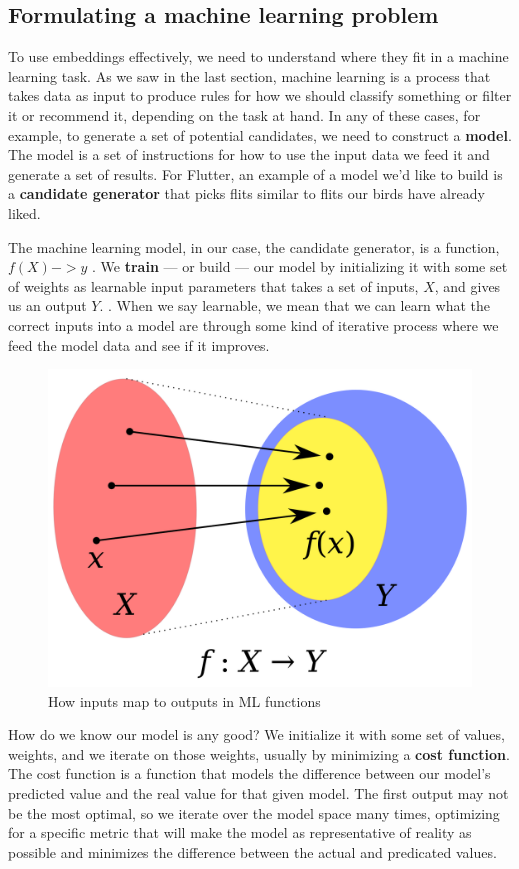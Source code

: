 \documentclass[11pt, table]{diazessay} %
\begin{document}
\begin{sloppypar}
\subsection{Formulating a machine learning problem}

To use embeddings effectively, we need to understand where they fit in a machine learning task. As we saw in the last section, machine learning is a process that takes data as input to produce rules for how we should classify something or filter it or recommend it, depending on the task at hand. In any of these cases, for example, to generate a set of potential candidates, we need to construct a \textbf{model}. The model is a set of instructions for how to use the input data we feed it and generate a set of results. For Flutter, an example of a model we'd like to build is a \textbf{candidate generator} that picks flits similar to flits our birds have already liked. 

The machine learning model, in our case, the candidate generator,  is a function, $f(X) -> y$ . We \textbf{train} --- or build --- our model by initializing it with some set of weights as learnable input parameters  that takes a set of inputs, $X$, and gives us an output $Y$. . When we say learnable, we mean that we can learn what the correct inputs into a model are through some kind of iterative process where we feed the model data and see if it improves.

\begin{figure}[H]
  \includegraphics[width=.8\linewidth]{figures/function.png}
  \caption{How inputs map to outputs in ML functions \citep{klein2013coding}}
\end{figure}

How do we know our model is any good? We initialize it with some set of values, weights, and we iterate on those weights, usually by minimizing a \textbf{cost function}. The cost function is a function that models the difference between our model's predicted value and the real value for that given model. The first output may not be the most optimal, so we iterate over the model space many times, optimizing for a specific metric that will make the model as representative of reality as possible and minimizes the difference between the actual and predicated values.  




\end{sloppypar}
\end{document}
